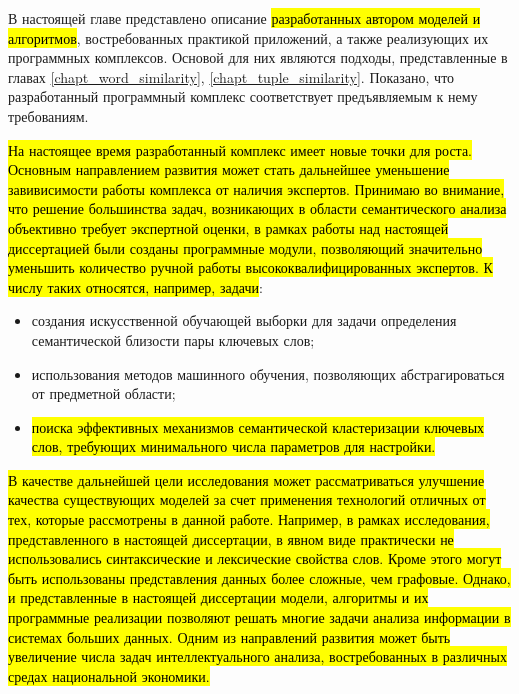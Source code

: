 В настоящей главе представлено описание \hl{разработанных автором моделей и алгоритмов}, востребованных практикой приложений, а также реализующих их программных комплексов. Основой для них являются подходы, представленные в главах \ref{chapt_word_similarity}, \ref{chapt_tuple_similarity}. Показано, что разработанный программный комплекс соответствует предъявляемым к нему требованиям. 

\hl{На настоящее время разработанный комплекс имеет новые точки для роста. Основным направлением развития может стать дальнейшее уменьшение завивисимости работы комплекса от наличия экспертов. Принимаю во внимание, что решение большинства задач, возникающих в области семантического анализа объективно требует экспертной оценки, в рамках работы над настоящей диссертацией были созданы программные модули, позволяющий значительно уменьшить количество ручной работы высококвалифицированных экспертов. К числу таких относятся, например, задачи}:
\begin{itemize}
    \item создания искусственной обучающей выборки для задачи определения семантической близости пары ключевых слов;
    \item использования методов машинного обучения, позволяющих абстрагироваться от предметной области;
    \item \hl{поиска эффективных механизмов семантической кластеризации ключевых слов, требующих минимального числа параметров для настройки.}
\end{itemize}

\hl{В качестве дальнейшей цели исследования может рассматриваться улучшение качества существующих моделей за счет применения технологий отличных от тех, которые рассмотрены в данной работе. Например, в рамках исследования, представленного в настоящей диссертации, в явном виде практически не использовались синтаксические и лексические свойства слов. Кроме этого могут быть использованы представления данных более сложные, чем графовые.  Однако, и представленные в настоящей диссертации модели, алгоритмы и их программные реализации позволяют решать многие задачи анализа информации в системах больших данных. Одним из направлений развития может быть увеличение числа задач интеллектуального анализа, востребованных в различных средах национальной экономики.}
